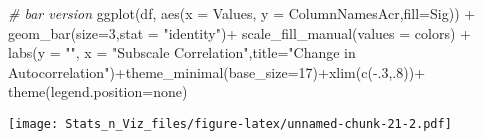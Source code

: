 \documentclass[
]{article}
\newenvironment{Shaded}{\begin{snugshade}}{\end{snugshade}}
\newcommand{\AttributeTok}[1]{\textcolor[rgb]{0.77,0.63,0.00}{#1}}
\newcommand{\CommentTok}[1]{\textcolor[rgb]{0.56,0.35,0.01}{\textit{#1}}}
\newcommand{\DecValTok}[1]{\textcolor[rgb]{0.00,0.00,0.81}{#1}}
\newcommand{\FunctionTok}[1]{\textcolor[rgb]{0.00,0.00,0.00}{#1}}
\newcommand{\NormalTok}[1]{#1}
\newcommand{\SpecialCharTok}[1]{\textcolor[rgb]{0.00,0.00,0.00}{#1}}
\newcommand{\StringTok}[1]{\textcolor[rgb]{0.31,0.60,0.02}{#1}}
\begin{document}
\begin{Shaded}
\begin{Highlighting}[]
\CommentTok{\# bar version}
\FunctionTok{ggplot}\NormalTok{(df, }\FunctionTok{aes}\NormalTok{(}\AttributeTok{x =}\NormalTok{ Values, }\AttributeTok{y =}\NormalTok{ ColumnNamesAcr,}\AttributeTok{fill=}\NormalTok{Sig)) }\SpecialCharTok{+}
  \FunctionTok{geom\_bar}\NormalTok{(}\AttributeTok{size=}\DecValTok{3}\NormalTok{,}\AttributeTok{stat =} \StringTok{"identity"}\NormalTok{)}\SpecialCharTok{+}
  \FunctionTok{scale\_fill\_manual}\NormalTok{(}\AttributeTok{values =}\NormalTok{ colors) }\SpecialCharTok{+}
  \FunctionTok{labs}\NormalTok{(}\AttributeTok{y =} \StringTok{""}\NormalTok{, }\AttributeTok{x =} \StringTok{"Subscale Correlation"}\NormalTok{,}\AttributeTok{title=}\StringTok{"Change in Autocorrelation"}\NormalTok{)}\SpecialCharTok{+}\FunctionTok{theme\_minimal}\NormalTok{(}\AttributeTok{base\_size=}\DecValTok{17}\NormalTok{)}\SpecialCharTok{+}\FunctionTok{xlim}\NormalTok{(}\FunctionTok{c}\NormalTok{(}\SpecialCharTok{{-}}\NormalTok{.}\DecValTok{3}\NormalTok{,.}\DecValTok{8}\NormalTok{))}\SpecialCharTok{+}
  \FunctionTok{theme}\NormalTok{(}\AttributeTok{legend.position=}\StringTok{\textquotesingle{}none\textquotesingle{}}\NormalTok{)}
\end{Highlighting}
\end{Shaded}

\texttt{[image: Stats\_n\_Viz\_files/figure-latex/unnamed-chunk-21-2.pdf]}
\end{document}
